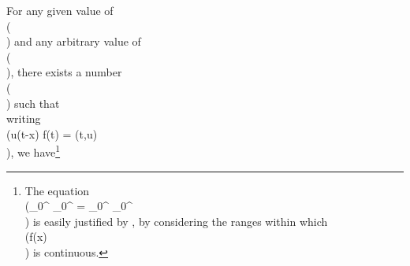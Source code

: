 For any given value of \\(\lambda\\) and any arbitrary value of \\(\eps\\), there exists a
number \\(\beta\\) such that
\\[ 
\int_{\beta}^{\infty}\!
\left| \, f(t) \, \right| 
\, d t
<
\frac{1}{2} \eps / \lambda;
\\] 
%
%
writing \\(\cos u(t-x) \cdot f(t) = \phi(t,u)\\), we
have\footnote{The equation
  \\(\int_{0}^{\beta} \int_{0}^{\lambda} = \int_{0}^{\lambda} \int_{0}^{\beta}\\)
  is easily justified by , by considering the ranges within
  which \\(f(x)\\) is continuous.}
\\[ \begin{align*}
  \left| \, 
    \int_{0}^{\infty}\! \left\{
      \int_{0}^{\lambda}\! \phi(t,u) \, d u
    \right\} \, d t
    -
    \int_{0}^{\lambda}\! \left\{
      \int_{0}^{\infty}\! \phi(t,u) \, d t
    \right\} \, d u
   \, \right| 
  \\
  \quad &
  =
  \int_{0}^{\beta}\!
  \left\{
    \int_{0}^{\lambda}\! \phi(t,u) \, d u
  \right\} \, d t
  +
  \int_{\beta}^{\infty}\!
  \left\{
    \int_{0}^{\lambda}\! \phi(t,u) \, d u
  \right\} \, d t
  \\
  \quad & \quad
  - \int_{0}^{\lambda}\! \left\{
    \int_{0}^{\beta}\! \phi(t,u) \, d t
  \right\} \, d u
  - \int_{0}^{\lambda}\! \left\{
    \int_{\beta}^{\infty}\! \phi(t,u) \, d t
  \right\} \, d u
  \\
  & =
  \left| \, 
    \int_{\beta}^{\infty}\! \left\{
      \int_{0}^{\lambda}\! \phi(t,u) \, d u
    \right\} \, d t
    -
     \int_{0}^{\lambda}\! \left\{
      \int_{\beta}^{\infty}\! \phi(t,u) \, d t
    \right\} \, d u
   \, \right| 
  \\
  & <
  \int_{\beta}^{\infty}\! \left\{
    \int_{0}^{\lambda}\! \left| \, \phi(t,u) \, \right|  \, d u
  \right\} \, d t
  -
  \int_{0}^{\lambda}\! \left\{
    \int_{\beta}^{\infty}\! \left| \, \phi(t,u) \, \right|  \, d t
  \right\} \, d u
  \\
  & <
  2 \lambda \int_{\beta}^{\infty}\! \left| \, f(t) \, \right|  \, d t
  <
  \eps
  .
\end{align*} \\]

